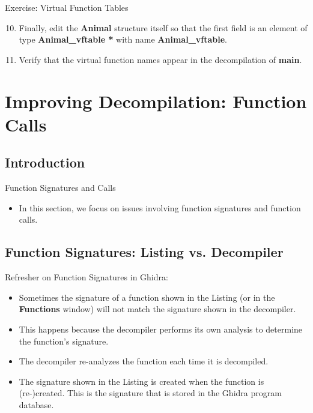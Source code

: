 \documentclass{beamer}
\begin{document}
\begin{frame}
\begin{block}{Exercise: Virtual Function Tables}
\begin{enumerate}
\setcounter{enumi}{9}
\item Finally, edit the \textbf{Animal} structure itself so that the first field is an element of type \textbf{Animal\_vftable *} with name \textbf{Animal\_vftable}.
\item Verify that the virtual function names appear in the decompilation of \textbf{main}.
\end{enumerate}
\end{block}
\end{frame}

\section{Improving Decompilation: Function Calls}

\subsection{Introduction}
\begin{frame}
\begin{block}{Function Signatures and Calls}
\begin{itemize}
\item In this section, we focus on issues involving function signatures and function calls.
\end{itemize}
\end{block}
\end{frame}

\subsection{Function Signatures: Listing vs. Decompiler}
\begin{frame}
\begin{block}{Refresher on Function Signatures in Ghidra:}
\begin{itemize}
\item Sometimes the signature of a function shown in the Listing (or in the \textbf{Functions} window) will not match the signature shown in the decompiler.
\item This happens because the decompiler performs its own analysis to determine the function's signature.
\item The decompiler re-analyzes the function each time it is decompiled.
\item The signature shown in the Listing is created when the function is (re-)created.  This is the signature that is stored in the Ghidra program database.
\end{itemize}
\end{block}
\end{frame}
\end{document}
